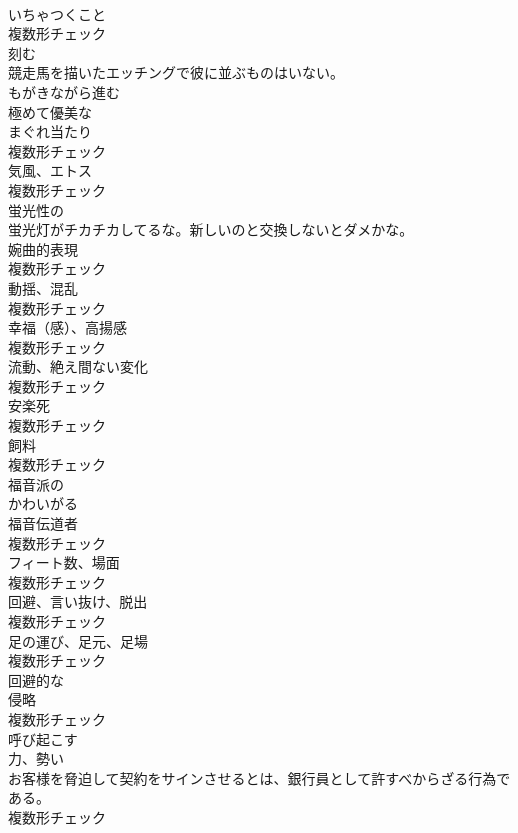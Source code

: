 \documentclass[8pt]{extreport}
\begin{document}
\begin{CJK}{UTF8}{min}
\\	[名詞]	いちゃつくこと	
\\	複数形チェック
\\	[動詞]	刻む	
\\	競走馬を描いたエッチングで彼に並ぶものはいない。	
\\	[動詞]	もがきながら進む	
\\	[形容詞]	極めて優美な	
\\	[名詞]	まぐれ当たり	
\\	複数形チェック
\\	[名詞]	気風、エトス	
\\	複数形チェック
\\	[形容詞]	蛍光性の	
\\	蛍光灯がチカチカしてるな。新しいのと交換しないとダメかな。	
\\	[名詞]	婉曲的表現	
\\	複数形チェック
\\	[名詞]	動揺、混乱	
\\	複数形チェック
\\	[名詞]	幸福（感）、高揚感	
\\	複数形チェック
\\	[名詞]	流動、絶え間ない変化	
\\	複数形チェック
\\	[名詞]	安楽死	
\\	複数形チェック
\\	[名詞]	飼料	
\\	複数形チェック
\\	[形容詞]	福音派の	
\\	[動詞]	かわいがる	
\\	[名詞]	福音伝道者	
\\	複数形チェック
\\	[名詞]	フィート数、場面	
\\	複数形チェック
\\	[名詞]	回避、言い抜け、脱出	
\\	複数形チェック
\\	[名詞]	足の運び、足元、足場	
\\	複数形チェック
\\	[形容詞]	回避的な	
\\	[名詞]	侵略	
\\	複数形チェック
\\	[形容詞]	呼び起こす	
\\	[名詞]	力、勢い	
\\	お客様を脅迫して契約をサインさせるとは、銀行員として許すべからざる行為である。	
\\	複数形チェック

\end{CJK}
\end{document}
